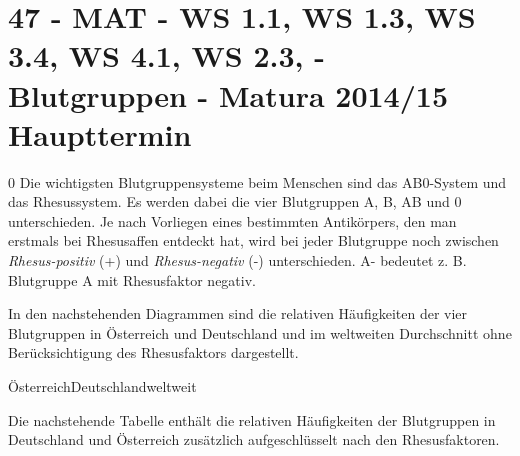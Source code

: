 \section{47 - MAT - WS 1.1, WS 1.3, WS 3.4, WS 4.1, WS 2.3,  - Blutgruppen - Matura 2014/15 Haupttermin}

\begin{langesbeispiel} \item[0] %
				Die wichtigsten Blutgruppensysteme beim Menschen sind das AB0-System und das Rhesussystem. Es werden dabei die vier Blutgruppen A, B, AB und 0 unterschieden. Je nach Vorliegen eines bestimmten Antikörpers, den man erstmals bei Rhesusaffen entdeckt hat, wird bei jeder Blutgruppe noch zwischen \textit{Rhesus-positiv} (+) und \textit{Rhesus-negativ} (-) unterschieden. A- bedeutet z. B. Blutgruppe A mit Rhesusfaktor negativ. 
				
In den nachstehenden Diagrammen sind die relativen Häufigkeiten der vier Blutgruppen in Österreich und Deutschland und im weltweiten Durchschnitt ohne Berücksichtigung des Rhesusfaktors dargestellt.


\hspace{1,4cm}Österreich\hspace{2,8cm}Deutschland\hspace{3,2cm}weltweit

\begin{scriptsize}
\hspace{0,7cm}
\hspace{0,7cm}
\end{scriptsize}

Die nachstehende Tabelle enthält die relativen Häufigkeiten der Blutgruppen in Deutschland und Österreich zusätzlich aufgeschlüsselt nach den Rhesusfaktoren.


\end{langesbeispiel}
